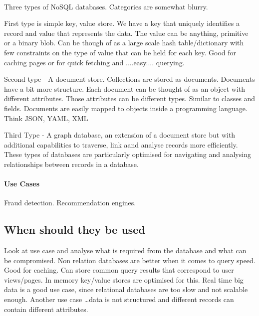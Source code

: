 \documentclass[a4paper, 11pt]{book}
\begin{document}
    \paragraph{}
    Three types of NoSQL databases.
    Categories are somewhat blurry.

    First type is simple key, value store.
    We have a key that uniquely identifies a record and value that represents the data.
    The value can be anything, primitive or a binary blob.
    Can be though of as a large scale hash table/dictionary with few constraints on the type of value that can be held for each key.
    Good for caching pages or for quick fetching and ....easy.... querying.

    Second type - A document store.
    Collections are stored as documents. Documents have a bit more structure.
    Each document can be thought of as an object with different attributes.
    Those attributes can be different types.
    Similar to classes and fields.
    Documents are easily mapped to objects inside a programming language. Think JSON, YAML, XML

    Third Type - A graph database, an extension of a document store but with additional capabilities to traverse, link aand analyse records more efficiently.
    These types of databases are particularly optimised for navigating and analysing relationships between records in a database.

    \paragraph{Use Cases}
    Fraud detection.
    Recommendation engines.

    \subsection{When should they be used}
    Look at use case and analyse what is required from the database and what can be compromised.
    Non relation databases are better when it comes to query speed.
    Good for caching.
    Can store common query results that correspond to user views/pages.
    In memory key/value stores are optimised for this.
    Real time big data is a good use case, since relational databases are too slow and not scalable enough.
    Another use case \ldots data is not structured and different records can contain different attributes.
\end{document}
